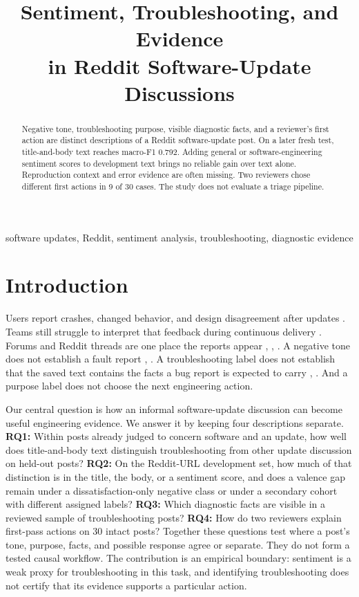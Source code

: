 \documentclass[conference,letterpaper]{IEEEtran}
\title{Sentiment, Troubleshooting, and Evidence\\
in Reddit Software-Update Discussions}
\author{\IEEEauthorblockN{Manu Mathew Jiss and Solomon Berhe}
\IEEEauthorblockA{School of Engineering and Computer Science\\
University of the Pacific, Stockton, California, USA\\
m\_jiss@u.pacific.edu, sberhe@pacific.edu}}
\begin{document}
\maketitle
\begin{abstract}
Negative tone, troubleshooting purpose, visible diagnostic facts, and a reviewer's first action are distinct descriptions of a Reddit software-update post. On a later fresh test, title-and-body text reaches macro-F1 0.792. Adding general or software-engineering sentiment scores to development text brings no reliable gain over text alone. Reproduction context and error evidence are often missing. Two reviewers chose different first actions in 9 of 30 cases. The study does not evaluate a triage pipeline.
\end{abstract}
\begin{IEEEkeywords}
software updates, Reddit, sentiment analysis, troubleshooting, diagnostic evidence
\end{IEEEkeywords}

\section{Introduction}
Users report crashes, changed behavior, and design disagreement after updates \cite{Hassan2020BadUpdates}. Teams still struggle to interpret that feedback during continuous delivery \cite{Tkalich2025Feedback}. Forums and Reddit threads are one place the reports appear \cite{Iqbal2021Reddit}, \cite{Tizard2019Forums}, \cite{Singh2024ReleaseNotes}. A negative tone does not establish a fault report \cite{Jongeling2017Negative}, \cite{Lin2018HowFar}. A troubleshooting label does not establish that the saved text contains the facts a bug report is expected to carry \cite{Bettenburg2008GoodReport}, \cite{Chaparro2017Missing}. And a purpose label does not choose the next engineering action.

Our central question is how an informal software-update discussion can become useful engineering evidence. We answer it by keeping four descriptions separate. \textbf{RQ1:} Within posts already judged to concern software and an update, how well does title-and-body text distinguish troubleshooting from other update discussion on held-out posts? \textbf{RQ2:} On the Reddit-URL development set, how much of that distinction is in the title, the body, or a sentiment score, and does a valence gap remain under a dissatisfaction-only negative class or under a secondary cohort with different assigned labels? \textbf{RQ3:} Which diagnostic facts are visible in a reviewed sample of troubleshooting posts? \textbf{RQ4:} How do two reviewers explain first-pass actions on 30 intact posts? Together these questions test where a post's tone, purpose, facts, and possible response agree or separate. They do not form a tested causal workflow. The contribution is an empirical boundary: sentiment is a weak proxy for troubleshooting in this task, and identifying troubleshooting does not certify that its evidence supports a particular action.
\end{document}
